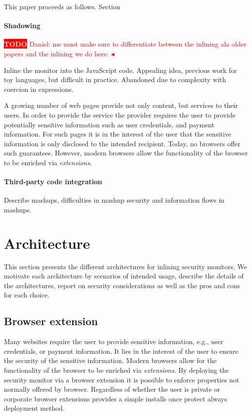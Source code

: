 \documentclass{llncs}
\newcommand{\todo}[1]{\colorbox{red}{\textcolor{white}{\sffamily\bfseries\scriptsize TODO}} \textcolor{red}{#1} \textcolor{red}{$\blacktriangleleft$}}
\begin{document}
This paper proceeds as follows. Section~



\paragraph{Shadowing}
\todo{Daniel: me must make sure to differentiate between the inlining ala older papers and the inlining we do here.}

Inline the monitor into the JavaScript code. Appealing idea, previous work for 
toy languages, but difficult in practice. Abandoned due to complexity with 
coercion in expressions.


A growing number of web pages provide not only content, but services to their
users. In order to provide the service the provider requires the user to
provide potentially sensitive information such as user credentials, and payment
information. For such pages it is in the interest of the user that the
sensitive information is only disclosed to the intended recipient.  Today, no
browsers offer such guarantees. However, modern browsers allow the
functionality of the browser to be enriched via \emph{extensions}. 


\paragraph{Third-party code integration}

Describe mashups, difficulties in mashup security and information flows in mashups.

\section{Architecture}
\label{sec:arch}

This section presents the different architectures for inlining
security monitors. We motivate each architecture by scenarios of
intended usage, describe the details of the architectures, report on
security considerations as well as the pros and cons for each choice.




\subsection{Browser extension}

Many websites require the user to provide sensitive information, e.g., user
credentials, or payment information. It lies in the interest of the user to
ensure the security of the sensitive information.  Modern browsers allow for
the functionality of the browser to be enriched via \emph{extensions}. By
deploying the security monitor via a browser extension it is possible to enforce
properties not normally offered by browser.  Regardless of whether the user is
private or corporate browser extensions provides a simple installs once protect
always deployment method.
\end{document}

